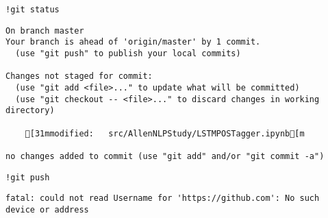 \documentclass[
]{article}
\begin{document}
\begin{verbatim}
!git status
\end{verbatim}

\begin{verbatim}
On branch master
Your branch is ahead of 'origin/master' by 1 commit.
  (use "git push" to publish your local commits)

Changes not staged for commit:
  (use "git add <file>..." to update what will be committed)
  (use "git checkout -- <file>..." to discard changes in working directory)

    [31mmodified:   src/AllenNLPStudy/LSTMPOSTagger.ipynb[m

no changes added to commit (use "git add" and/or "git commit -a")
\end{verbatim}

\begin{verbatim}
!git push 
\end{verbatim}

\begin{verbatim}
fatal: could not read Username for 'https://github.com': No such device or address
\end{verbatim}
\end{document}
